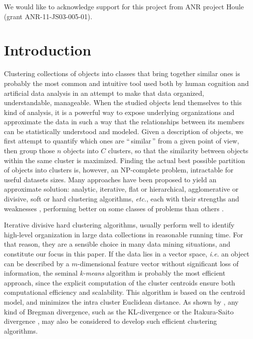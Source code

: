 \documentclass[natbib,smallextended]{svjour3}
\begin{document}

We would like to acknowledge support for this project
from ANR project Houle (grant ANR-11-JS03-005-01).

\section{Introduction}

Clustering collections of objects into classes that bring together similar ones is probably the most common and intuitive tool used both by human cognition and artificial data analysis in an attempt to make that data organized, understandable, manageable. When the studied objects lend themselves to this kind of analysis, it is a powerful way to expose underlying organizations and approximate the data in such a way that the relationships between its members can be statistically understood and modeled. Given a description of objects, we first attempt to quantify which ones are ``\,similar\,'' from a given point of view, then group those $n$ objects into $C$ clusters, so that the similarity between objects within the same cluster is maximized. Finding the actual best possible partition of objects into clusters is, however, an NP-complete problem, intractable for useful datasets sizes. Many approaches have been proposed to yield an approximate solution: analytic, iterative, flat or hierarchical, agglomerative or divisive, soft or hard clustering algorithms, \textit{etc.}, each with their strengths and weaknesses \citep{jain2010data}, performing better on some classes of problems than others \citep{steinbach2000comparison,thalamuthu2006evaluation}.

Iterative divisive hard clustering algorithms, usually perform well to identify high-level organization in large data collections in reasonable running time. For that reason, they are a sensible choice in many data mining situations, and constitute our focus in this paper.
If the data lies in a vector space, \textit{i.e.} an object can be described by a $m$-dimensional feature vector without significant loss of information, the seminal \emph{k-means} algorithm \citep{macQueenBsmsp67} is probably the most efficient approach, since the explicit computation of the cluster centroids ensure both computational efficiency and scalability. This algorithm is  based on the centroid model, and minimizes the intra cluster Euclidean distance. As shown by \citet{Banerjee:2005:CBD:1046920.1194902}, any kind of Bregman divergence, such as the KL-divergence \citep{Dhillon:2003:DIT:944919.944973} or the Itakura-Saito divergence \citep{linde:algorithm}, may also be considered to develop such efficient clustering algorithms.
\end{document}
